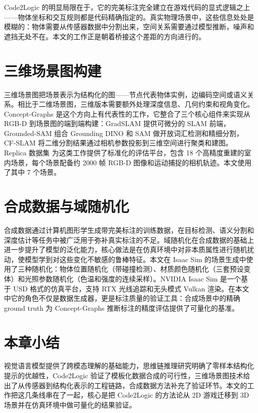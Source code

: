 Code2Logic 的明显局限在于，它的完美标注完全建立在游戏代码的显式逻辑之上——物体坐标和交互规则都是代码精确指定的。真实物理场景中，这些信息处处是模糊的：物体需要从传感器数据中分割出来，空间关系需要通过模型推断，噪声和遮挡无处不在。本文的工作正是朝着桥接这个差距的方向进行的。

\section{三维场景图构建}

三维场景图把场景表示为结构化的图——节点代表物体实例，边编码空间或语义关系。相比于二维场景图，三维版本需要额外处理深度信息、几何约束和视角变化。Concept-Graphs\cite{conceptgraphs} 是这个方向上有代表性的工作，它整合了三个核心组件来实现从 RGB-D 到场景图的端到端构建：GradSLAM\cite{gradslam} 提供可微分的 SLAM 前端，Grounded-SAM\cite{grounded_sam} 组合 Grounding DINO 和 SAM 做开放词汇检测和精细分割，CF-SLAM 将二维分割结果通过相机参数投影到三维空间进行聚类和建图。Replica 数据集\cite{replica} 为这类工作提供了标准化的评估平台，包含 18 个高精度重建的室内场景，每个场景配备约 2000 帧 RGB-D 图像和运动捕捉的相机轨迹。本文使用了其中 7 个场景。

\section{合成数据与域随机化}

合成数据通过计算机图形学生成带完美标注的训练数据，在目标检测、语义分割和深度估计等任务中被广泛用于弥补真实标注的不足。域随机化在合成数据的基础上进一步提升了模型的泛化能力，核心做法是在仿真环境中对非本质属性进行随机扰动，使模型学到对这些变化不敏感的鲁棒特征。本文在 Isaac Sim 的场景生成中使用了三种随机化：物体位置随机化（带碰撞检测）、材质颜色随机化（三套预设变体）和光照参数随机化（色温和强度的连续采样）。NVIDIA Isaac Sim\cite{isaac_sim} 是一个基于 USD 格式的仿真平台，支持 RTX 光线追踪和无头模式 Vulkan 渲染。在本文中它的角色不仅是数据生成器，更是标注质量的验证工具：合成场景中的精确 ground truth 为 Concept-Graphs 推断标注的精度评估提供了可量化的基准。

\section{本章小结}

视觉语言模型提供了跨模态理解的基础能力，思维链推理研究明确了零样本结构化提示的优越性，Code2Logic 验证了模板化数据合成的可行性，三维场景图技术给出了从传感器到结构化表示的工程链路，合成数据方法补充了验证环节。本文的工作把这几条线串在了一起，核心是把 Code2Logic 的方法论从 2D 游戏迁移到 3D 场景并在仿真环境中做可量化的结果验证。
